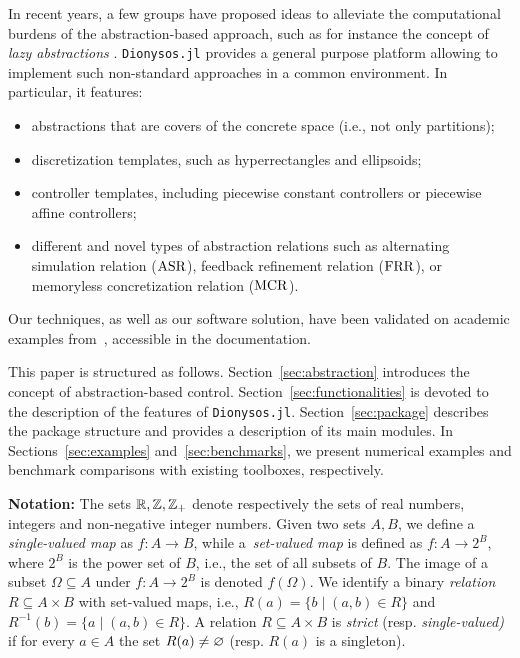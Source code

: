 \documentclass{juliacon}
\begin{document}
\vskip 6pt
In recent years, a few groups have proposed ideas to alleviate the computational burdens of the abstraction-based approach, such as for instance the concept of \emph{lazy abstractions} \cite{camara2011safety,girard2015safety,tazaki2009discrete,hsu2018multi}.
\texttt{Dionysos.jl} provides a general purpose platform allowing to implement such non-standard approaches in a common environment. In particular, it features:
\begin{itemize}
    \item abstractions that are covers of the concrete space (i.e., not only partitions);
    \item discretization templates, such as hyperrectangles and ellipsoids;
    \item controller templates, including piecewise constant controllers or piecewise affine controllers;
    \item different and novel types of abstraction relations such as alternating simulation relation ($\operatorname{ASR}$), feedback refinement relation ($\operatorname{FRR}$), or memoryless concretization relation ($\operatorname{MCR}$).
\end{itemize}


\vskip 6pt
%
Our techniques, as well as our software solution, have been validated on academic examples from~\cite{girard2009approximately,mouelhi2013cosyma,reissig2016feedback,gol2014language}, accessible in the documentation.

\vskip 6pt
This paper is structured as follows.  Section~\ref{sec:abstraction} introduces the concept of abstraction-based control. Section~\ref{sec:functionalities} is devoted to the description of the features of \texttt{Dionysos.jl}. Section~\ref{sec:package} describes the package structure and provides a description of its main modules. In Sections~\ref{sec:examples} and~\ref{sec:benchmarks}, we present numerical examples and benchmark comparisons with existing toolboxes, respectively.

\vskip 6pt
\noindent \textbf{Notation:} 
The sets $\mathbb{R},\mathbb{Z}, \mathbb{Z}_+$ denote respectively the sets of real numbers, integers and non-negative integer numbers.
Given two sets $A,B$, we define a \emph{single-valued map} as $f:A\rightarrow B$, while a~\emph{set-valued map} is defined as $f:A\rightarrow 2^B$, where $2^B$ is the power set of $B$, i.e., the set of all subsets of $B$. 
The image of a subset $\Omega\subseteq A$ under $f:A\rightarrow 2^B$ is denoted $f(\Omega)$.
We identify a binary \emph{relation} $R\subseteq A \times B$ with set-valued maps, i.e., $R(a) = \{b \mid (a, b)\in R\}$ and $R^{-1}(b) =\{ a \mid (a, b)\in R\}$.
%
A relation $R\subseteq A\times B$ is \emph{strict} (resp. \emph{single-valued)} if for every $a\in A$ the set $R(a)\ne \varnothing$ (resp. $R(a)$ is a singleton). 
\end{document}
